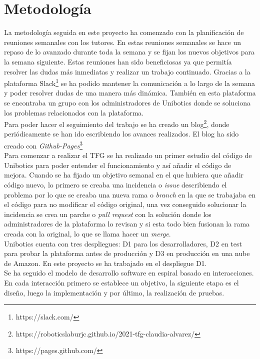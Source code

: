 \section{Metodología}

La metodología seguida en este proyecto ha comenzado con la planificación de reuniones semanales con los tutores. En estas reuniones semanales se hace un repaso de lo avanzado durante toda la semana y se fijan los nuevos objetivos para la semana siguiente. Estas reuniones han sido beneficiosas ya que permitía resolver las dudas más inmediatas y realizar un trabajo continuado. Gracias a la plataforma Slack\footnote{https://slack.com/} se ha podido mantener la comunicación a lo largo de la semana y poder resolver dudas de una manera más dinámica. También en esta plataforma se encontraba un grupo con los administradores de Unibotics donde se soluciona los problemas relacionados con la plataforma.\\

Para poder hacer el seguimiento del trabajo se ha creado un blog\footnote{https://roboticslaburjc.github.io/2021-tfg-claudia-alvarez/}, donde periódicamente se han ido escribiendo los avances realizados. El blog ha sido creado con \textit{Github-Pages}\footnote{https://pages.github.com/}\\

Para comenzar a realizar el TFG se ha realizado un primer estudio del código de Unibotics para poder entender el funcionamiento y así añadir el código de mejora. Cuando se ha fijado un objetivo semanal en el que hubiera que añadir código nuevo, lo primero se creaba una incidencia o \textit{issue} describiendo el problema por lo que se creaba una nueva rama o \textit{branch} en la que se trabajaba en el código para no modificar el código original, una vez conseguido solucionar la incidencia se crea un parche o \textit{pull request} con la solución donde los administradores de la plataforma lo revisan y si esta todo bien fusionan la rama creada con la original, lo que se llama hacer un \textit{merge}.\\

Unibotics cuenta con tres despliegues: D1 para los desarrolladores, D2 en test para probar la plataforma antes de producción y D3 en producción en una nube de Amazon. En este proyecto se ha trabajado en el despliegue D1.\\

Se ha seguido el modelo de desarrollo software en espiral basado en interacciones. En cada interacción primero se establece un objetivo, la siguiente etapa es el diseño, luego la implementación y por último, la realización de pruebas.


